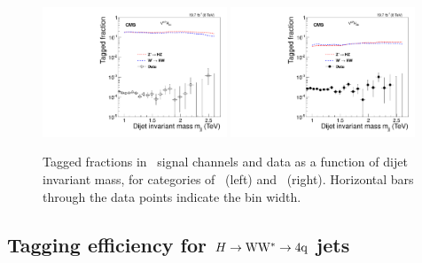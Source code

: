 \begin{figure}[ht!b]
\begin{center}
\includegraphics[width=0.49\textwidth]{EXO-14-009/HbbZqqfigs/Signal/HbbVqq-signal-taggingEff-8TeV.pdf}
\includegraphics[width=0.49\textwidth]{EXO-14-009/HbbZqqfigs/Signal/HbbVqq-signal-taggingEff-LowV-8TeV.pdf}
\end{center}
\caption{
Tagged fractions in \HbbVqq\ signal channels and data
as a function of dijet invariant mass, for categories of 
\HbbHP\ (left) and \HbbLP\ (right). Horizontal bars 
through the data points indicate the bin width. 
}
\label{fig:HbbZqqOverallEff}
\end{figure}




\clearpage





\subsection{Tagging efficiency for $H\to{\rm W}{\rm W}^*\to4{\rm q}$ jets}


